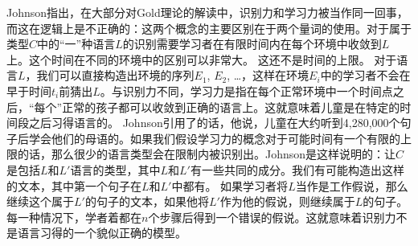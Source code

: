 Johnson指出，在大部分对Gold理论的解读中，识别力和学习力被当作同一回事，而这在逻辑上是不正确的：这两个概念的主要区别在于两个量词的使用。对于属于类型$C$中的“一”种语言$L$的识别需要学习者在有限时间内在每个环境中收敛到$L$上。这个时间在不同的环境中的区别可以非常大。
这还不是时间的上限。
对于语言$L$，我们可以直接构造出环境的序列$E_1$, $E_2$, \ldots{}，这样在环境$E_i$中的学习者不会在早于时间$t_i$前猜出$L$。与识别力不同，学习力是指在每个正常环境中一个时间点之后，“每个”正常的孩子都可以收敛到正确的语言上。这就意味着儿童是在特定的时间段之后习得语言的。
 Johnson引用了\citet[]{Morgan89a}的话，他说，儿童在大约听到4,280,000个句子后学会他们的母语的。如果我们假设学习力的概念对于可能时间有一个有限的上限的话，那么很少的语言类型会在限制内被识别出。Johnson是这样说明的：让$C$是包括$L$和$L'$语言的类型，其中$L$和$L'$有一些共同的成分。我们有可能构造出这样的文本，其中第一个句子在$L$和$L'$中都有。
如果学习者将$L$当作是工作假说，那么继续这个属于$L'$的句子的文本，如果他将$L'$作为他的假说，则继续属于$L$的句子。每一种情况下，学者着都在$n$个步骤后得到一个错误的假说。这就意味着识别力不是语言习得的一个貌似正确的模型。

